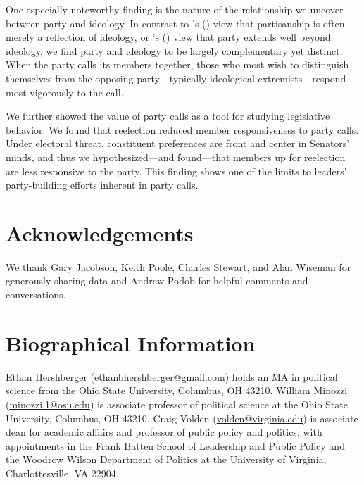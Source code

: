 \documentclass[12pt]{article}
\def\citeapos#1{\citeauthor{#1}'s (\citeyear{#1})}
\begin{document}
One especially noteworthy finding is the nature of the relationship we uncover
between party and ideology.
In contrast to \citeapos{Krehbiel:1993} view that partisanship is often merely
a reflection of ideology, or \citeapos{Lee:2009} view that party extends well
beyond ideology, we find party and ideology to be largely complementary yet
distinct.
When the party calls its members together, those who most wish to distinguish
themselves from the opposing party---typically ideological extremists---respond
most vigorously to the call.

We further showed the value of party calls as a tool for studying legislative
behavior.
We found that reelection reduced member responsiveness to party calls.
Under electoral threat, constituent preferences are front and center in
Senators' minds, and thus we hypothesized---and found---that members up for
reelection are less responsive to the party.
This finding shows one of the limits to leaders' party-building efforts
inherent in party calls.

\section*{Acknowledgements}
We thank Gary Jacobson, Keith Poole, Charles Stewart,
and Alan Wiseman for generously sharing data
and Andrew Podob for helpful comments and conversations.




\section*{Biographical Information}

\noindent
Ethan Hershberger
(\href{mailto:ethanbhershberger@gmail.com}{ethanbhershberger@gmail.com})
holds an MA in political science from the Ohio State University, Columbus, OH
43210. William Minozzi (\href{mailto:minozzi.1@osu.edu}{minozzi.1@osu.edu})
is associate professor of political science at the Ohio State University,
Columbus, OH 43210. Craig Volden
(\href{mailto:volden@virginia.edu}{volden@virginia.edu})
is associate dean for academic affairs and professor of public policy and
politics, with appointments in the Frank Batten School of Leadership and Public
Policy and the Woodrow Wilson Department of Politics at the University of
Virginia, Charlottesville, VA 22904.
\end{document}
